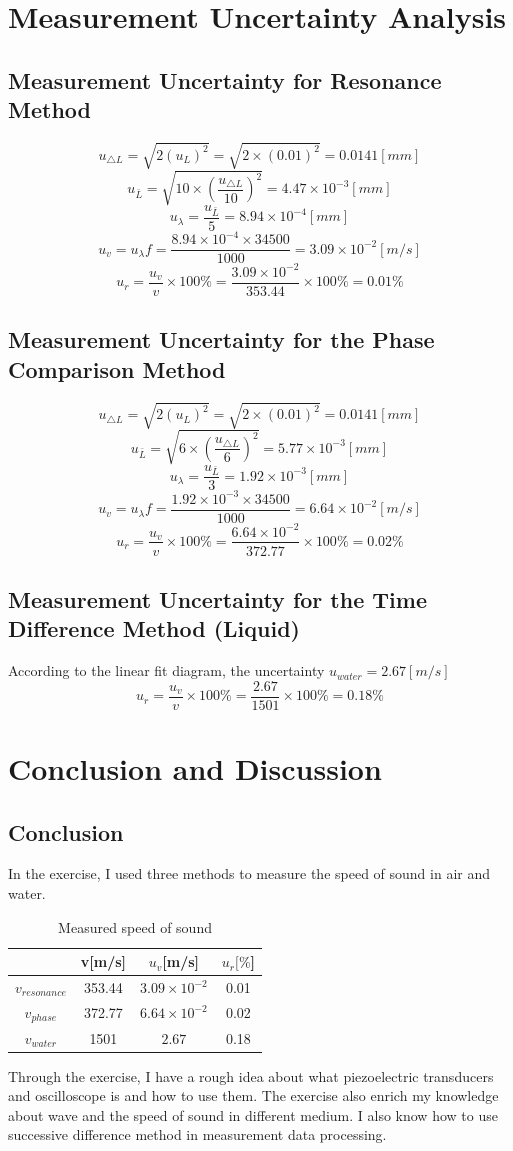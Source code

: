 \documentclass[12pt]{article}
\begin{document}
\section{Measurement Uncertainty Analysis}
\subsection{Measurement Uncertainty for Resonance Method}
$$u_{\bigtriangleup L}=\sqrt{2(u_L)^2}=\sqrt{2\times(0.01)^2}=0.0141[mm]$$
$$u_{\bar{L}}=\sqrt{10\times(\frac{u_{\bigtriangleup L}}{10})^2}=4.47\times10^{-3}[mm]$$
$$u_{\lambda}=\frac{u_{\bar{L}}}{5}=8.94\times10^{-4}[mm]$$
$$u_v=u_{\lambda}f=\frac{8.94\times10^{-4}\times34500}{1000}=3.09\times10^{-2}[m/s]$$
$$u_r=\frac{u_v}{v}\times100\%=\frac{3.09\times10^{-2}}{353.44}\times100\%=0.01\%$$
\subsection{Measurement Uncertainty for the Phase Comparison Method}
$$u_{\bigtriangleup L}=\sqrt{2(u_L)^2}=\sqrt{2\times(0.01)^2}=0.0141[mm]$$
$$u_{\bar{L}}=\sqrt{6\times(\frac{u_{\bigtriangleup L}}{6})^2}=5.77\times10^{-3}[mm]$$
$$u_{\lambda}=\frac{u_{\bar{L}}}{3}=1.92\times10^{-3}[mm]$$
$$u_v=u_{\lambda}f=\frac{1.92\times10^{-3}\times34500}{1000}=6.64\times10^{-2}[m/s]$$
$$u_r=\frac{u_v}{v}\times100\%=\frac{6.64\times10^{-2}}{372.77}\times100\%=0.02\%$$
\subsection{Measurement Uncertainty for the Time Difference Method (Liquid)}
According to the linear fit diagram, the uncertainty $u_{water}=2.67[m/s]$ 
$$u_r=\frac{u_v}{v}\times100\%=\frac{2.67}{1501}\times100\%=0.18\%$$
\section{Conclusion and Discussion}
\subsection{Conclusion}
In the exercise, I used three methods to measure the speed of sound in air and water.
\begin{table}[H]
\centering
\begin{tabular}{|c|c|c|c|}
\hline
   & v[m/s] & $u_v$[m/s] &$u_r[\%$]  \\ \hline
$v_{resonance}$  &353.44  &$3.09\times10^{-2}$&0.01  \\ \hline
$v_{phase}$  &372.77  &$6.64\times10^{-2}$&0.02  \\ \hline
$v_{water}$  &1501  &$2.67$&0.18  \\ \hline
\end{tabular}
\caption{Measured speed of sound}
\end{table}
Through the exercise, I have a rough idea about what piezoelectric transducers and oscilloscope is and how to use them. The exercise also enrich my knowledge about wave and the speed of sound in different medium. I also know how to use successive difference method in measurement data processing.
\end{document}
